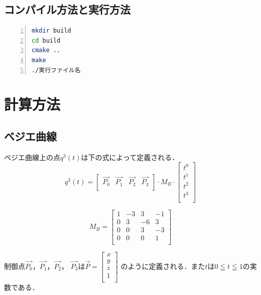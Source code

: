 \documentclass[a4paper,10pt]{jsarticle}
\begin{document}
\subsection{コンパイル方法と実行方法}

\begin{lstlisting}[basicstyle=\ttfamily\footnotesize, language=Bash, frame=single, firstnumber=1, numbers=left, breaklines=true]
mkdir build
cd build
cmake ..
make
./実行ファイル名
\end{lstlisting}

\section{計算方法}
\subsection{ベジエ曲線}
ベジエ曲線上の点$q^3(t)$は下の式によって定義される．
\begin{equation}
\label{eq:a}
  q^3(t) = \left[
    \begin{array}{cccc}
      \vec{P_0} & \vec{P_1} & \vec{P_2} & \vec{P_3} \\
    \end{array}
  \right]\cdot M_B \cdot
  \left[
    \begin{array}{c}
      t^0\\
      t^1\\
      t^2\\
      t^3\\
    \end{array}
  \right]
\end{equation}

\begin{equation}
\label{eq:b}
  M_B =
  \left[
    \begin{array}{cccc}
      1 & -3 & 3 & -1 \\
      0 & 3 & -6 & 3\\
      0 & 0 & 3 & -3\\
      0 & 0 & 0 & 1\\
    \end{array}
  \right]
\end{equation}

制御点$\vec{P_0}$，$\vec{P_1}$，$\vec{P_2}$， $\vec{P_3}$は$\vec{P}=\left[
    \begin{array}{c}
      x\\
      y\\
      z\\
      1\\
    \end{array}
  \right]$
のように定義される．また$t$は$0\leqq t \leqq 1$の実数である．
\end{document}
